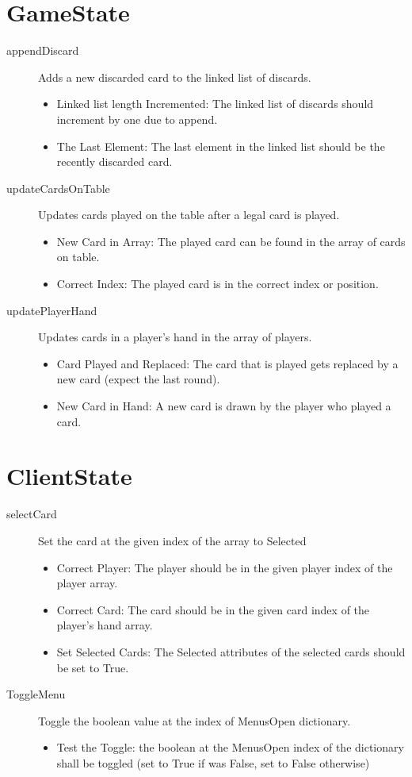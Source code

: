 \documentclass[12pt]{article}
\begin{document}
\section{GameState}
\begin{description}
	\item[appendDiscard] Adds a new discarded card to the linked list of discards.
	\begin{itemize}
		\item Linked list length Incremented: The linked list of discards should increment by one due to append.
		\item The Last Element: The last element in the linked list should be the recently discarded card.
	\end{itemize}
	\item[updateCardsOnTable] Updates cards played on the table after a legal card is played.
	\begin{itemize}
		\item New Card in Array: The played card can be found in the array of cards on table.
		\item Correct Index: The played card is in the correct index or position.
    \end{itemize}
    \item[updatePlayerHand] Updates cards in a player's hand in the array of players.
	\begin{itemize}
		\item Card Played and Replaced: The card that is played gets replaced by a new card (expect the last round).
		\item New Card in Hand: A new card is drawn by the player who played a card.
	\end{itemize}
\end{description}

\section{ClientState}
\begin{description}
	\item[selectCard] Set the card at the given index of the array to Selected
	\begin{itemize}
		\item Correct Player: The player should be in the given player index of the player array.
		\item Correct Card: The card should be in the given card index of the player's hand array.
		\item Set Selected Cards: The Selected attributes of the selected cards should be set to True.
	\end{itemize}
	\item[ToggleMenu] Toggle the boolean value at the index of MenusOpen dictionary.
	\begin{itemize}
		\item Test the Toggle: the boolean at the MenusOpen index of the dictionary shall be toggled (set to True if was False, set to False otherwise)
    \end{itemize}
\end{description}
\end{document}
